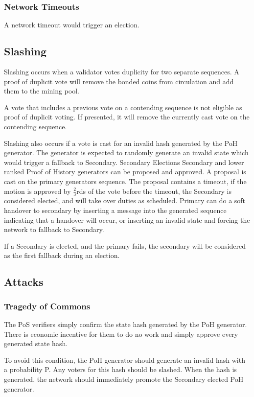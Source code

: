 \documentclass[12pt]{article}
\begin{document}
\subsubsection{Network Timeouts}

A network timeout would trigger an election.

\subsection{Slashing}
Slashing occurs when a validator votes duplicity for two separate sequences.  A proof of duplicit vote will remove the bonded coins from circulation and add them to the mining pool.

A vote that includes a previous vote on a contending sequence is not eligible as proof of duplicit voting.  If presented, it will remove the currently cast vote on the contending sequence.

Slashing also occurs if a vote is cast for an invalid hash generated by the PoH generator.  The generator is expected to randomly generate an invalid state which would trigger a fallback to Secondary.
Secondary Elections
Secondary and lower ranked Proof of History generators can be proposed and approved.  A proposal is cast on the primary generators sequence.  The proposal contains a timeout, if the motion is approved by \(\frac{2}{3}\)rds of the vote before the timeout, the Secondary is considered elected, and will take over duties as scheduled.  Primary can do a soft handover to secondary by inserting a message into the generated sequence indicating that a handover will occur, or inserting an invalid state and forcing the network to fallback to Secondary.

If a Secondary is elected, and the primary fails, the secondary will be considered as the first fallback during an election.

\subsection{Attacks}
\subsubsection{Tragedy of Commons}

The PoS verifiers simply confirm the state hash generated by the PoH generator.  There is economic incentive for them to do no work and simply approve every generated state hash.  

To avoid this condition, the PoH generator should generate an invalid hash with a probability P.  Any voters for this hash should be slashed.  When the hash is generated, the network should immediately promote the Secondary elected PoH generator.
\end{document}
